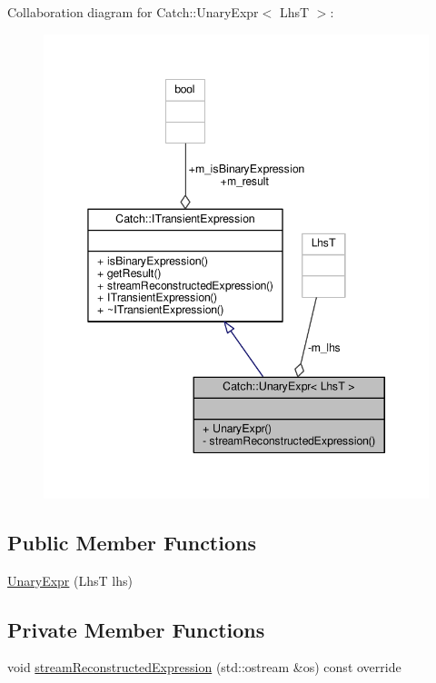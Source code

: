 Collaboration diagram for Catch\-:\-:Unary\-Expr$<$ Lhs\-T $>$\-:
\nopagebreak
\begin{figure}[H]
\begin{center}
\leavevmode
\includegraphics[width=345pt]{class_catch_1_1_unary_expr__coll__graph}
\end{center}
\end{figure}
\subsection*{Public Member Functions}
\begin{DoxyCompactItemize}
\item 
\hyperlink{class_catch_1_1_unary_expr_ae02f666a1e64da728628aa2033e1d6e7}{Unary\-Expr} (Lhs\-T lhs)
\end{DoxyCompactItemize}
\subsection*{Private Member Functions}
\begin{DoxyCompactItemize}
\item 
void \hyperlink{class_catch_1_1_unary_expr_aaabf30455a996c80675c0f388a6e4110}{stream\-Reconstructed\-Expression} (std\-::ostream \&os) const override
\end{DoxyCompactItemize}
